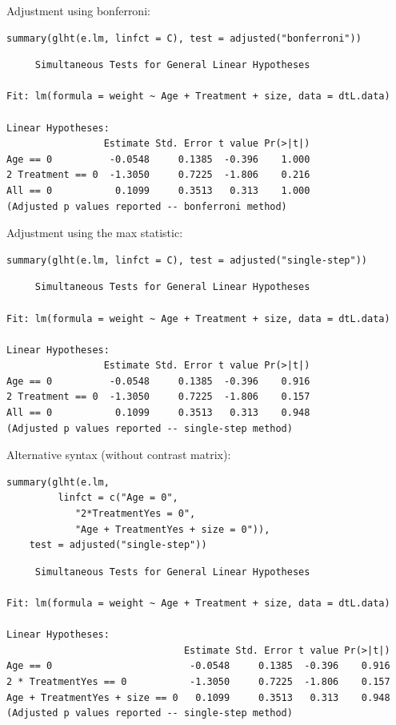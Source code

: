 \documentclass{article}
\begin{document}
Adjustment using bonferroni:
\lstset{language=r,label= ,caption= ,captionpos=b,numbers=none}
\begin{lstlisting}
summary(glht(e.lm, linfct = C), test = adjusted("bonferroni"))
\end{lstlisting}

\begin{verbatim}
	 Simultaneous Tests for General Linear Hypotheses

Fit: lm(formula = weight ~ Age + Treatment + size, data = dtL.data)

Linear Hypotheses:
                 Estimate Std. Error t value Pr(>|t|)
Age == 0          -0.0548     0.1385  -0.396    1.000
2 Treatment == 0  -1.3050     0.7225  -1.806    0.216
All == 0           0.1099     0.3513   0.313    1.000
(Adjusted p values reported -- bonferroni method)
\end{verbatim}

Adjustment using the max statistic:
\lstset{language=r,label= ,caption= ,captionpos=b,numbers=none}
\begin{lstlisting}
summary(glht(e.lm, linfct = C), test = adjusted("single-step"))
\end{lstlisting}

\begin{verbatim}
	 Simultaneous Tests for General Linear Hypotheses

Fit: lm(formula = weight ~ Age + Treatment + size, data = dtL.data)

Linear Hypotheses:
                 Estimate Std. Error t value Pr(>|t|)
Age == 0          -0.0548     0.1385  -0.396    0.916
2 Treatment == 0  -1.3050     0.7225  -1.806    0.157
All == 0           0.1099     0.3513   0.313    0.948
(Adjusted p values reported -- single-step method)
\end{verbatim}

Alternative syntax (without contrast matrix):
\lstset{language=r,label= ,caption= ,captionpos=b,numbers=none}
\begin{lstlisting}
summary(glht(e.lm, 
	     linfct = c("Age = 0",
			"2*TreatmentYes = 0",
			"Age + TreatmentYes + size = 0")), 
	test = adjusted("single-step"))
\end{lstlisting}

\begin{verbatim}
	 Simultaneous Tests for General Linear Hypotheses

Fit: lm(formula = weight ~ Age + Treatment + size, data = dtL.data)

Linear Hypotheses:
                               Estimate Std. Error t value Pr(>|t|)
Age == 0                        -0.0548     0.1385  -0.396    0.916
2 * TreatmentYes == 0           -1.3050     0.7225  -1.806    0.157
Age + TreatmentYes + size == 0   0.1099     0.3513   0.313    0.948
(Adjusted p values reported -- single-step method)
\end{verbatim}
\end{document}
